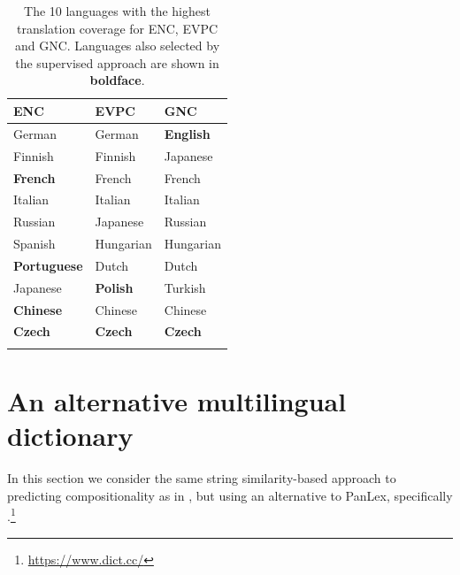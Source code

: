\documentclass[output=paper,modfonts,nonflat]{langsci/langscibook}
\begin{document}
\begin{table}[t]
\begin{center}
\begin{tabular}{l l l } \lsptoprule

ENC&EVPC&GNC\\
\midrule
German & German & \textbf{English}\\
Finnish  & Finnish & Japanese\\
\textbf{French}& French & French\\
Italian& Italian & Italian\\
Russian&  Japanese & Russian\\
Spanish & Hungarian & Hungarian\\
\textbf{Portuguese} & Dutch & Dutch\\
Japanese& \textbf{Polish}&  Turkish\\
\textbf{Chinese} & Chinese & Chinese\\
\textbf{Czech}&  \textbf{Czech} &\textbf{Czech}\\
\lspbottomrule

\end{tabular}

\end{center}
\caption{\label{tab:ss:cov} The 10 languages with the highest
  translation coverage for ENC, EVPC and GNC. Languages also selected
  by the supervised approach are shown in \textbf{boldface}.}
\end{table}




\section{An alternative multilingual dictionary\label{sec:dictcc}}

In this section we consider the same string similarity-based approach
to predicting compositionality as in , but
using an alternative  to PanLex, specifically
\dictcc.\footnote{\url{https://www.dict.cc/}}

\end{document}

